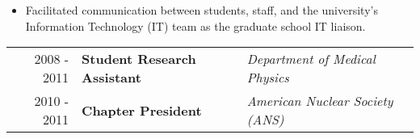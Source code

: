 \begin{minipage}{\textwidth}
\begin{itemize}
		\item Facilitated communication between students, staff, and the university's Information Technology (IT) team as the graduate school IT liaison.
	\end{itemize}
\end{minipage}


\begin{minipage}{\textwidth}
		\begin{tabular}{r|ll}
			2008 - 2011 & \textbf{Student Research Assistant} & \textit{Department of Medical Physics} \\
			2010 - 2011 & \textbf{Chapter President} & \textit{American Nuclear Society (ANS)} \\
		\end{tabular}
\end{minipage}

